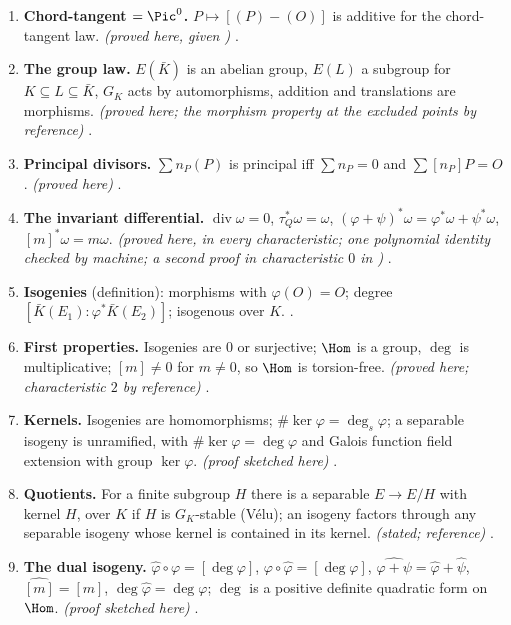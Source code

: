 \begin{enumerate}[label=\textbf{\thechapter.\arabic*}]
\item \textbf{Chord-tangent $=\Pic^0$.} $P\mapsto[(P)-(O)]$ is additive for the chord-tangent law. \emph{(proved here, given )} .
\item \textbf{The group law.} $E(\bar K)$ is an abelian group, $E(L)$ a subgroup for $K\subseteq L\subseteq\bar K$, $G_K$ acts by automorphisms, addition and translations are morphisms. \emph{(proved here;
the morphism property at the excluded points by reference)} .
\item \textbf{Principal divisors.} $\sum n_P(P)$ is principal iff $\sum n_P=0$ and $\sum[n_P]P=O$. \emph{(proved here)} .
\item \textbf{The invariant differential.} $\operatorname{div}\omega=0$, $\tau_Q^*\omega=\omega$, $(\varphi+\psi)^*\omega=\varphi^*\omega+\psi^*\omega$, $[m]^*\omega=m\omega$. \emph{(proved here, in every characteristic; one polynomial identity checked by
machine; a second proof in characteristic $0$ in )} .
\item \textbf{Isogenies} (definition): morphisms with $\varphi(O)=O$; degree $[\bar K(E_1):\varphi^*\bar K(E_2)]$; isogenous over $K$. .
\item \textbf{First properties.} Isogenies are $0$ or surjective; $\Hom$ is a group, $\deg$ is multiplicative; $[m]\ne0$ for $m\ne0$, so $\Hom$ is torsion-free. \emph{(proved here; characteristic $2$ by reference)}
.
\item \textbf{Kernels.} Isogenies are homomorphisms; $\#\ker\varphi=\deg_s\varphi$; a separable isogeny is unramified, with $\#\ker\varphi=\deg\varphi$ and Galois function field extension with group
$\ker\varphi$. \emph{(proof sketched here)} .
\item \textbf{Quotients.} For a finite subgroup $H$ there is a separable $E\to E/H$ with kernel $H$, over $K$ if $H$ is $G_K$-stable (V\'elu); an isogeny factors through any separable isogeny
whose kernel is contained in its kernel. \emph{(stated; reference)} .
\item \textbf{The dual isogeny.} $\hat\varphi\circ\varphi=[\deg\varphi]$, $\varphi\circ\hat\varphi=[\deg\varphi]$, $\widehat{\varphi+\psi}=\hat\varphi+\hat\psi$, $\widehat{[m]}=[m]$, $\deg\hat\varphi=\deg\varphi$; $\deg$ is a positive definite
quadratic form on $\Hom$. \emph{(proof sketched here)} .

\end{enumerate}
